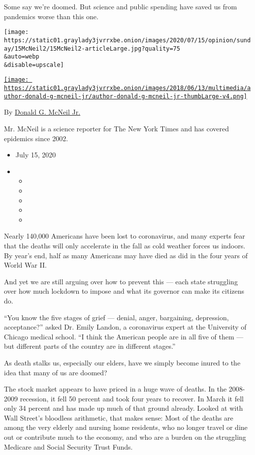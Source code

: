 Some say we're doomed. But science and public spending have saved us
from pandemics worse than this one.

\texttt{[image: https://static01.graylady3jvrrxbe.onion/images/2020/07/15/opinion/sunday/15McNeil2/15McNeil2-articleLarge.jpg?quality=75\\\&auto=webp\\\&disable=upscale]}

\href{https://www.nytimes3xbfgragh.onion/by/donald-g-mcneil-jr}{\texttt{[image: https://static01.graylady3jvrrxbe.onion/images/2018/06/13/multimedia/author-donald-g-mcneil-jr/author-donald-g-mcneil-jr-thumbLarge-v4.png]}}

By
\href{https://www.nytimes3xbfgragh.onion/by/donald-g-mcneil-jr}{Donald
G. McNeil Jr.}

Mr. McNeil is a science reporter for The New York Times and has covered
epidemics since 2002.

\begin{itemize}
\item
  July 15, 2020
\item
  \begin{itemize}
  \item
  \item
  \item
  \item
  \item
  \end{itemize}
\end{itemize}

Nearly 140,000 Americans have been lost to coronavirus, and many experts
fear that the deaths will only accelerate in the fall as cold weather
forces us indoors. By year's end, half as many Americans may have died
as did in the four years of World War II.

And yet we are still arguing over how to prevent this --- each state
struggling over how much lockdown to impose and what its governor can
make its citizens do.

``You know the five stages of grief --- denial, anger, bargaining,
depression, acceptance?'' asked Dr. Emily Landon, a coronavirus expert
at the University of Chicago medical school. ``I think the American
people are in all five of them --- but different parts of the country
are in different stages.''

As death stalks us, especially our elders, have we simply become inured
to the idea that many of us are doomed?

The stock market appears to have priced in a huge wave of deaths. In the
2008-2009 recession, it fell 50 percent and took four years to recover.
In March it fell only 34 percent and has made up much of that ground
already. Looked at with Wall Street's bloodless arithmetic, that makes
sense: Most of the deaths are among the very elderly and nursing home
residents, who no longer travel or dine out or contribute much to the
economy, and who are a burden on the struggling Medicare and Social
Security Trust Funds.

